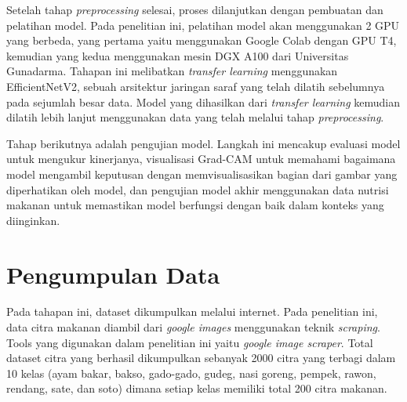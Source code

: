 Setelah tahap \textit{preprocessing} selesai, proses dilanjutkan dengan pembuatan dan pelatihan model. Pada penelitian ini, pelatihan model akan menggunakan 2 GPU yang berbeda, yang pertama yaitu menggunakan Google Colab dengan GPU T4, kemudian yang kedua menggunakan mesin DGX A100 dari Universitas Gunadarma. Tahapan ini melibatkan \textit{transfer learning} menggunakan EfficientNetV2, sebuah arsitektur jaringan saraf yang telah dilatih sebelumnya pada sejumlah besar data. Model yang dihasilkan dari \textit{transfer learning} kemudian dilatih lebih lanjut menggunakan data yang telah melalui tahap \textit{preprocessing}.

Tahap berikutnya adalah pengujian model. Langkah ini mencakup evaluasi model untuk mengukur kinerjanya, visualisasi Grad-CAM untuk memahami bagaimana model mengambil keputusan dengan memvisualisasikan bagian dari gambar yang diperhatikan oleh model, dan pengujian model akhir menggunakan data nutrisi makanan untuk memastikan model berfungsi dengan baik dalam konteks yang diinginkan.

\section{Pengumpulan Data}
Pada tahapan ini, dataset dikumpulkan melalui internet. Pada penelitian ini, data citra makanan diambil dari \textit{google images} menggunakan teknik \textit{scraping}. Tools yang digunakan dalam penelitian ini yaitu \textit{google image scraper}. Total dataset citra yang berhasil dikumpulkan sebanyak 2000 citra yang terbagi dalam 10 kelas (ayam bakar, bakso, gado-gado, gudeg, nasi goreng, pempek, rawon, rendang, sate, dan soto) dimana setiap kelas memiliki total 200 citra makanan.

